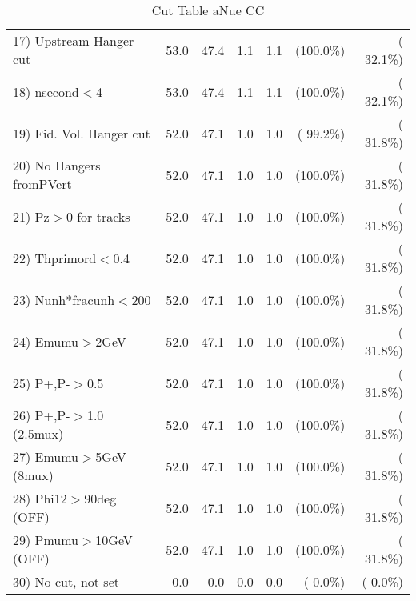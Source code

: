 \begin{table}[h!]
\begin{tabular}{||l||r|r|r|r|r|r||}
 17) Upstream Hanger cut  &         53.0 &         47.4 &          1.1 &          1.1 & (100.0\%) & ( 32.1\%) \\
 18) nsecond$<$4          &         53.0 &         47.4 &          1.1 &          1.1 & (100.0\%) & ( 32.1\%) \\
 19) Fid. Vol. Hanger cut &         52.0 &         47.1 &          1.0 &          1.0 & ( 99.2\%) & ( 31.8\%) \\
 20) No Hangers fromPVert &         52.0 &         47.1 &          1.0 &          1.0 & (100.0\%) & ( 31.8\%) \\
 21) Pz$>$0 for tracks    &         52.0 &         47.1 &          1.0 &          1.0 & (100.0\%) & ( 31.8\%) \\
 22) Thprimord$<$0.4      &         52.0 &         47.1 &          1.0 &          1.0 & (100.0\%) & ( 31.8\%) \\
 23) Nunh*fracunh$<$200   &         52.0 &         47.1 &          1.0 &          1.0 & (100.0\%) & ( 31.8\%) \\
 24) Emumu$>$2GeV         &         52.0 &         47.1 &          1.0 &          1.0 & (100.0\%) & ( 31.8\%) \\
 25) P+,P-$>$0.5          &         52.0 &         47.1 &          1.0 &          1.0 & (100.0\%) & ( 31.8\%) \\
 26) P+,P-$>$1.0 (2.5mux) &         52.0 &         47.1 &          1.0 &          1.0 & (100.0\%) & ( 31.8\%) \\
 27) Emumu$>$5GeV  (8mux) &         52.0 &         47.1 &          1.0 &          1.0 & (100.0\%) & ( 31.8\%) \\
 28) Phi12$>$90deg  (OFF) &         52.0 &         47.1 &          1.0 &          1.0 & (100.0\%) & ( 31.8\%) \\
 29) Pmumu$>$10GeV  (OFF) &         52.0 &         47.1 &          1.0 &          1.0 & (100.0\%) & ( 31.8\%) \\
 30) No cut, not set      &          0.0 &          0.0 &          0.0 &          0.0 & (  0.0\%) & (  0.0\%) \\
 \hline
 \hline
 \end{tabular}
 \caption{Cut Table  aNue CC  }
 \label{tab-cutheavy_neutrino_3.000}
 \end{table}
